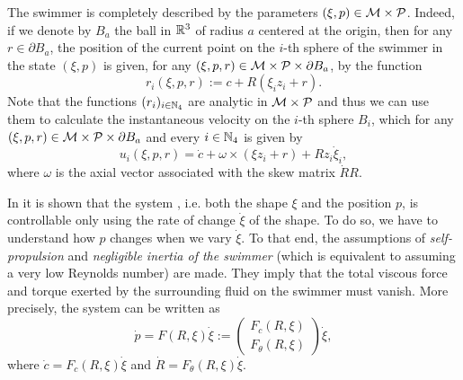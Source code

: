 The swimmer is completely described by the parameters $(\xi, p) \in \mathcal{M} \times \mathcal{P}$. Indeed, if we denote by $B_a$ the ball in $\mathbb{R}^3$ of radius $a$ centered at the origin, then for any $r \in \partial B_a$, the position of the current point on the $i$-th sphere of the swimmer in the state $(\xi, p)$ is given, for any $(\xi, p, r) \in \mathcal{M} \times \mathcal{P} \times \partial B_a$, by the function
\begin{equation}
	r_i(\xi, p, r) :=  c + R(\xi_i z_i + r).
\end{equation}
Note that the functions $(r_i)_{i \in \mathbb{N}_4}$ are analytic in $\mathcal{M}  \times \mathcal{P}$ and thus we can use them to calculate the instantaneous velocity on the $i$-th sphere $B_i$, which for any $(\xi, p, r) \in \mathcal{M} \times \mathcal{P} \times \partial B_a$ and every $i \in \mathbb{N}_4$ is given by
\begin{equation}
	u_i(\xi, p, r) = \dot{c} + \omega \times (\xi z_i + r) + R z_i \dot{\xi}_i,
\end{equation}
where $\omega$ is the axial vector associated with the skew matrix $\dot{R} R$.

In \cite{Alouges2013} it is shown that the system \spr, i.e. both the shape $\xi$ and the position $p$, is controllable only using the rate of change $\dot{\xi}$ of the shape. To do so, we have to understand how $p$ changes when we vary $\dot{\xi}$. To that end, the assumptions of \emph{self-propulsion} and \emph{negligible inertia of the swimmer} (which is equivalent to assuming a very low Reynolds number) are made. They imply that the total viscous force and torque exerted by the surrounding fluid on the swimmer must vanish. More precisely, the system can be written as
\begin{equation}
\label{eq: control system}
	\dot{p} = F(R, \xi) \dot{\xi} := \left ( \begin{array}{c}
	F_c(R, \xi) \\
	F_\theta(R, \xi)
	\end{array}  \right ) \dot{\xi},
\end{equation}
where $\dot{c} = F_c(R, \xi) \dot{\xi}$ and $\dot{R} = F_\theta (R, \xi) \dot{\xi} $. 

